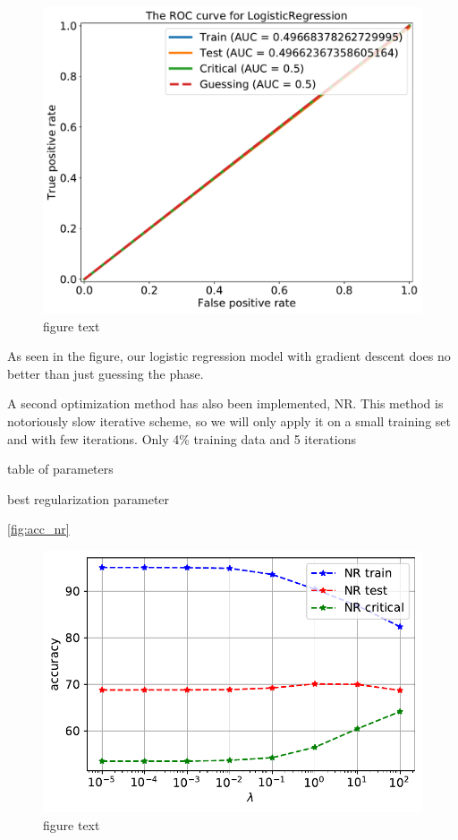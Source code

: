 \begin{figure}[H]
\begin{center}\includegraphics[scale=0.5]{latex/figures/logistic_roc_curve_gd.pdf}
\end{center}
\caption{figure text}
\label{fig:roc_gd}
\end{figure}

As seen in the figure, our logistic regression model with gradient descent does no better than just guessing the phase.

A second optimization method has also been implemented, NR.
This method is notoriously slow iterative scheme, so we will only apply it on a small training set and with few iterations. Only 4\% training data and 5 iterations 

table of parameters

best regularization parameter

\autoref{fig:acc_nr}

\begin{figure}[H]
\begin{center}\includegraphics[scale=0.7]{latex/figures/log_acc_nr.pdf}
\end{center}
\caption{figure text}
\label{fig:acc_nr}
\end{figure}

